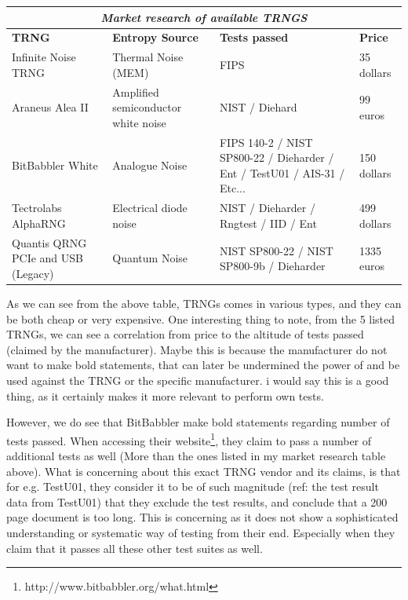 \documentclass[]{final_report}
\begin{document}
\begin{tabular}{ |p{4cm}||p{4cm}|p{3cm}|p{3cm}|  }
 \hline
 \multicolumn{4}{|c|}{\textbf{\textit{Market research of available TRNGS}}} \\
 \hline
 \textbf{TRNG}& \textbf{Entropy Source} & \textbf{Tests passed} & \textbf{Price}\\
 \hline
 Infinite Noise TRNG  & Thermal Noise (MEM) & FIPS & 35 dollars\\ 
 \hline
 Araneus Alea II & Amplified semiconductor white noise & NIST / Diehard & 99 euros \\
 \hline
 BitBabbler White & Analogue Noise & FIPS 140-2 / NIST SP800-22 / Dieharder / Ent / TestU01 / AIS-31 / Etc...& 150 dollars \\
 \hline
 Tectrolabs AlphaRNG & Electrical diode noise & NIST / Dieharder / Rngtest / IID / Ent & 499 dollars \\
 \hline
 Quantis QRNG PCIe and USB (Legacy) & Quantum Noise & NIST SP800-22 / NIST SP800-9b / Dieharder & 1335 euros\\
 \hline
\end{tabular}

\par{As we can see from the above table, TRNGs comes in various types, and they can be both cheap or very expensive. One interesting thing to note, from the 5 listed TRNGs, we can see a correlation from price to the altitude of tests passed (claimed by the manufacturer). Maybe this is because the manufacturer do not want to make bold statements, that can later be undermined the power of and be used against the TRNG or the specific manufacturer. i would say this is a good thing, as it certainly makes it more relevant to perform own tests.}

\par{However, we do see that BitBabbler make bold statements regarding number of tests passed. When accessing their website\footnote{http://www.bitbabbler.org/what.html}, they claim to pass a number of additional tests as well (More than the ones listed in my market research table above). What is concerning about this exact TRNG vendor and its claims, is that for e.g. TestU01, they consider it to be of such magnitude (ref: the test result data from TestU01) that they exclude the test results, and conclude that a 200 page document is too long. This is concerning as it does not show a sophisticated understanding or systematic way of testing from their end. Especially when they claim that it passes all these other test suites as well.}
\end{document}
